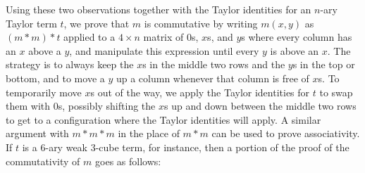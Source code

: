 \begin{rem}
Using these two observations together with the Taylor identities for an $n$-ary Taylor term $t$, we prove that $m$ is commutative by writing $m(x,y)$ as $(m*m)*t$ applied to a $4\times n$ matrix of $0$s, $x$s, and $y$s where every column has an $x$ above a $y$, and manipulate this expression until every $y$ is above an $x$. The strategy is to always keep the $x$s in the middle two rows and the $y$s in the top or bottom, and to move a $y$ up a column whenever that column is free of $x$s. To temporarily move $x$s out of the way, we apply the Taylor identities for $t$ to swap them with $0$s, possibly shifting the $x$s up and down between the middle two rows to get to a configuration where the Taylor identities will apply. A similar argument with $m*m*m$ in the place of $m*m$ can be used to prove associativity. If $t$ is a $6$-ary weak 3-cube term, for instance, then a portion of the proof of the commutativity of $m$ goes as follows:

\end{rem}
